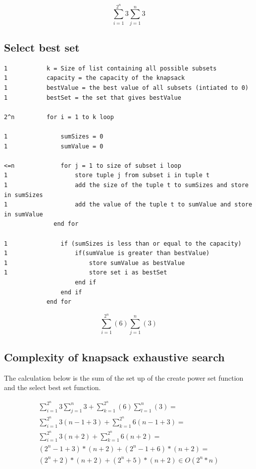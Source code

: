 \documentclass{inc/mas}
\begin{document}
\begin{equation}
\sum^{2^n}_{i =1}3\sum^n_{j=1}3%
\end{equation}


\subsection{Select best set}

\begin{lstlisting}
1			k = Size of list containing all possible subsets
1			capacity = the capacity of the knapsack
1			bestValue = the best value of all subsets (intiated to 0)
1			bestSet = the set that gives bestValue

2^n			for i = 1 to k loop

1				sumSizes = 0
1				sumValue = 0

<=n				for j = 1 to size of subset i loop
1					store tuple j from subset i in tuple t
1					add the size of the tuple t to sumSizes and store in sumSizes
1					add the value of the tuple t to sumValue and store in sumValue
			  end for

1				if (sumSizes is less than or equal to the capacity)
1					if(sumValue is greater than bestValue)
1						store sumValue as bestValue
1						store set i as bestSet
					end if
				end if
			end for
\end{lstlisting}


\begin{equation}
\sum^{2^n}_{i=1}(6)\sum^n_{j=1}(3)
\end{equation}

\subsection{Complexity of knapsack exhaustive search}

The calculation below is the sum of the set up of the create power set function and the select best set function.

\begin{equation}
\begin{split}
\sum^{2^n}_{i =1}3\sum^n_{j=1}3+\sum^{2^n}_{k=1}(6)\sum^n_{l=1}(3)= \\
\sum^{2^n}_{i =1}3(n-1+3) + \sum^{2^n}_{k =1}6(n-1+3) =  \\
\sum^{2^n}_{i =1}3(n+2) + \sum^{2^n}_{k =1}6(n+2) = \\
(2^n-1+3)*(n+2) + (2^n-1+6)*(n+2) = \\
(2^n+2)*(n+2) + (2^n+5)*(n+2) \in O(2^n*n)
\end{split}
\end{equation}
\end{document}
